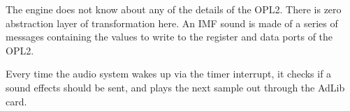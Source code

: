 \documentclass[book.tex]{subfiles}
\begin{document}
The engine does not know about any of the details of the OPL2. There is zero abstraction layer of transformation here. An IMF sound is made of a series of messages containing the values to write to the register and data ports of the OPL2.\\

\par
Every time the audio system wakes up via the timer interrupt, it checks if a sound effects should be sent, and plays the next sample out through the AdLib card.\\
\end{document}
